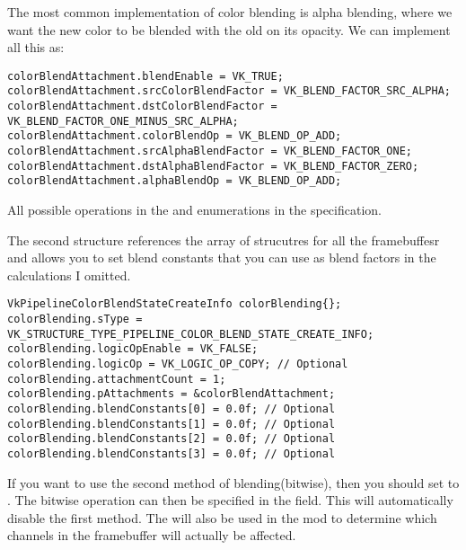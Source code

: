 \par The most common implementation of color blending is alpha blending, where we want the new color to be blended with the old on its opacity. We can implement all this as:

\begin{center}
\begin{minipage}{0.95\linewidth}
\begin{lstlisting}
colorBlendAttachment.blendEnable = VK_TRUE;
colorBlendAttachment.srcColorBlendFactor = VK_BLEND_FACTOR_SRC_ALPHA;
colorBlendAttachment.dstColorBlendFactor = VK_BLEND_FACTOR_ONE_MINUS_SRC_ALPHA;
colorBlendAttachment.colorBlendOp = VK_BLEND_OP_ADD;
colorBlendAttachment.srcAlphaBlendFactor = VK_BLEND_FACTOR_ONE;
colorBlendAttachment.dstAlphaBlendFactor = VK_BLEND_FACTOR_ZERO;
colorBlendAttachment.alphaBlendOp = VK_BLEND_OP_ADD;
\end{lstlisting}
\end{minipage}
\end{center}

\par All possible operations in the  and  enumerations in the specification.

\par The second structure references the array of strucutres for all the framebuffesr and allows you to set blend constants that you can use as blend factors in the calculations I omitted.

\begin{center}
\begin{minipage}{0.95\linewidth}
\begin{lstlisting}
VkPipelineColorBlendStateCreateInfo colorBlending{};
colorBlending.sType = VK_STRUCTURE_TYPE_PIPELINE_COLOR_BLEND_STATE_CREATE_INFO;
colorBlending.logicOpEnable = VK_FALSE;
colorBlending.logicOp = VK_LOGIC_OP_COPY; // Optional
colorBlending.attachmentCount = 1;
colorBlending.pAttachments = &colorBlendAttachment;
colorBlending.blendConstants[0] = 0.0f; // Optional
colorBlending.blendConstants[1] = 0.0f; // Optional
colorBlending.blendConstants[2] = 0.0f; // Optional
colorBlending.blendConstants[3] = 0.0f; // Optional
\end{lstlisting}
\end{minipage}
\end{center}

\par If you want to use the second method of blending(bitwise), then you should set  to . The bitwise operation can then be specified in the  field. This will automatically disable the first method. The  will also be used in the mod to determine which channels in the framebuffer will actually be affected.

